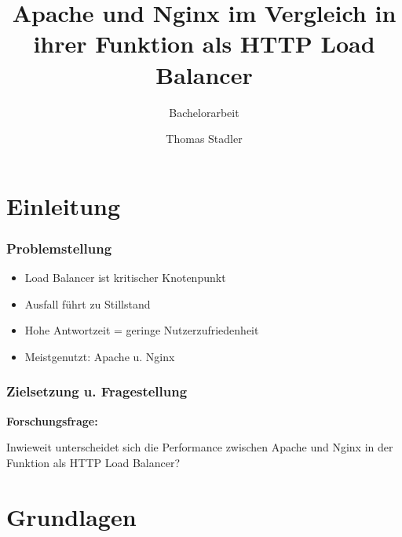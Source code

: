 \documentclass{beamer}
\title{Apache und Nginx im Vergleich in ihrer Funktion als HTTP Load Balancer}
\subtitle{Bachelorarbeit}
\author{Thomas Stadler}
\begin{document}

\maketitle

\section{Einleitung}

\begin{frame}
    \frametitle{Problemstellung}
    \begin{itemize}
        \item Load Balancer ist kritischer Knotenpunkt
        \item Ausfall führt zu Stillstand
        \item Hohe Antwortzeit = geringe Nutzerzufriedenheit
        \item Meistgenutzt: Apache u. Nginx
    \end{itemize}
\end{frame}

\begin{frame}
    \frametitle{Zielsetzung u. Fragestellung}
    \textbf{Forschungsfrage: }
    \begin{center}
        \large{Inwieweit unterscheidet sich die Performance zwischen Apache und Nginx in der Funktion als HTTP Load Balancer?}
    \end{center}
\end{frame}

\section{Grundlagen}
\end{document}
